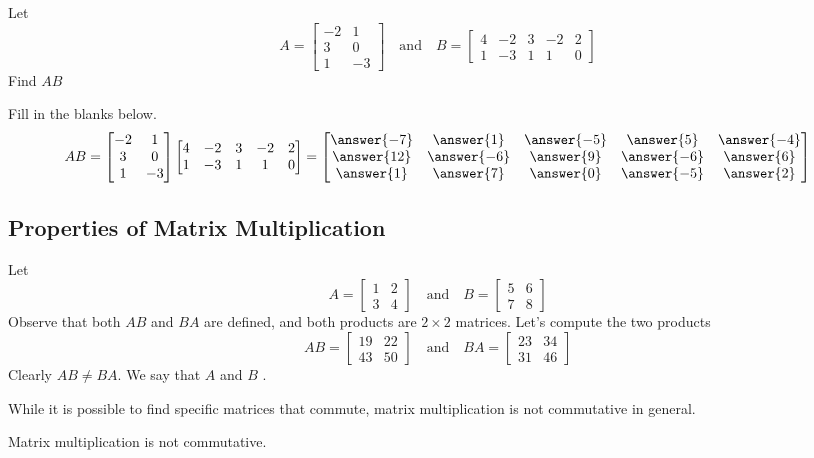 \documentclass{ximera}
\begin{document}
\begin{example}\label{ex:matmatproduct2} Let
$$A=\begin{bmatrix}-2 & 1\\3 & 0\\1 & -3\end{bmatrix}\quad\text{and}\quad B=\begin{bmatrix}4 & -2 & 3 & -2 &2\\1 & -3 & 1 & 1 &0\end{bmatrix}$$
Find $AB$
\begin{explanation}
Fill in the blanks below.  
$$AB=\begin{bmatrix}-2 & 1\\3 & 0\\1 & -3\end{bmatrix}\begin{bmatrix}4 & -2 & 3 & -2 &2\\1 & -3 & 1 & 1 &0\end{bmatrix}=\begin{bmatrix}\answer{-7} &\answer{1} & \answer{-5} & \answer{5} & \answer{-4}\\\answer{12} & \answer{-6} & \answer{9} & \answer{-6} & \answer{6}\\\answer{1} & \answer{7} & \answer{0} & \answer{-5} & \answer{2}\end{bmatrix}$$

\end{explanation}
\end{example}

\subsection*{Properties of Matrix Multiplication}
\begin{exploration}\label{init:matmultnotcomm}
Let $$A=\begin{bmatrix}1&2\\3&4\end{bmatrix}\quad\text{and}\quad B=\begin{bmatrix}5&6\\7&8\end{bmatrix}$$
Observe that both $AB$ and $BA$ are defined, and both products are $2\times 2$ matrices.  Let's compute the two products
$$AB=\begin{bmatrix}19&22\\43&50\end{bmatrix}\quad\text{and}\quad BA=\begin{bmatrix}23&34\\31&46\end{bmatrix}$$
Clearly $AB\neq BA$. We say that $A$ and $B$ .
\end{exploration}
While it is possible to find specific matrices that commute, matrix multiplication is not commutative in general.
\begin{warning}Matrix multiplication is not commutative.
\end{warning}
\end{document}
